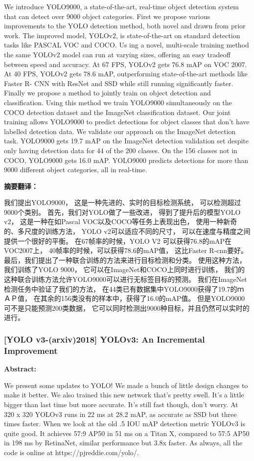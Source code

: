 \documentclass[a4paper, notitlepage]{article}
\begin{document}
We introduce YOLO9000, a state-of-the-art, real-time
object detection system that can detect over 9000 object
categories. First we propose various improvements to the
YOLO detection method, both novel and drawn from prior
work. The improved model, YOLOv2, is state-of-the-art on
standard detection tasks like PASCAL VOC and COCO. Us
ing a novel, multi-scale training method the same YOLOv2
model can run at varying sizes, offering an easy tradeoff
between speed and accuracy. At 67 FPS, YOLOv2 gets
76.8 mAP on VOC 2007. At 40 FPS, YOLOv2 gets 78.6
mAP, outperforming state-of-the-art methods like Faster R-
CNN with ResNet and SSD while still running significantly
faster. Finally we propose a method to jointly train on object detection and classification. Using this method we train
YOLO9000 simultaneously on the COCO detection dataset
and the ImageNet classification dataset. Our joint training
allows YOLO9000 to predict detections for object classes
that don’t have labelled detection data. We validate our
approach on the ImageNet detection task. YOLO9000 gets
19.7 mAP on the ImageNet detection validation set despite
only having detection data for 44 of the 200 classes. On
the 156 classes not in COCO, YOLO9000 gets 16.0 mAP.
YOLO9000 predicts detections for more than 9000 different
object categories, all in real-time.

\textbf{摘要翻译：}

我们提出YOLO9000，
这是一种先进的、实时的目标检测系统，
可以检测超过9000个类别。
首先，我们对YOLO做了一些改进，
得到了提升后的模型YOLO v2，
这是一种在如Pascal VOC以及COCO等任务上表现出色，
使用一种新奇的、多尺度的训练方法，
YOLO v2可以适应不同的尺寸，
可以在速度与精度之间提供一个很好的平衡。
在67帧率的时候，YOLO V2 可以获得76.8的mAP在VOC2007上，
40帧率的时候，可以获得78.6的mAP值，
这比Faster R-cnn要好。
最后，我们提出了一种联合训练的方法来进行目标检测和分类。
使用这种方法，我们训练了YOLO 9000，
它可以在ImageNet和COCO上同时进行训练，
我们的这种联合训练方法允许YOLO9000可以进行无标签目标的预测。
我们在ImageNet检测任务中验证了我们的方法，
在44类已有数据集中YOLO9000获得了19.7的ｍＡＰ值，
在其余的156类没有的样本中，获得了16.0的mAP值。
但是YOLO9000可不是只能预测200类数据，
它可以同时检测出9000种目标，并且仍然可以实时的进行。

\subsubsection{[YOLO v3-(arxiv)2018] YOLOv3: An Incremental Improvement}
\textbf{Abstract:}

We present some updates to YOLO! We made a bunch
of little design changes to make it better. We also trained
this new network that’s pretty swell. It’s a little bigger than
last time but more accurate. It’s still fast though, don’t
worry. At 320 x 320 YOLOv3 runs in 22 ms at 28.2 mAP,
as accurate as SSD but three times faster. When we look
at the old .5 IOU mAP detection metric YOLOv3 is quite
good. It achieves 57:9 AP50 in 51 ms on a Titan X, compared
to 57:5 AP50 in 198 ms by RetinaNet, similar performance
but 3.8x faster. As always, all the code is online at
https://pjreddie.com/yolo/.
\end{document}
